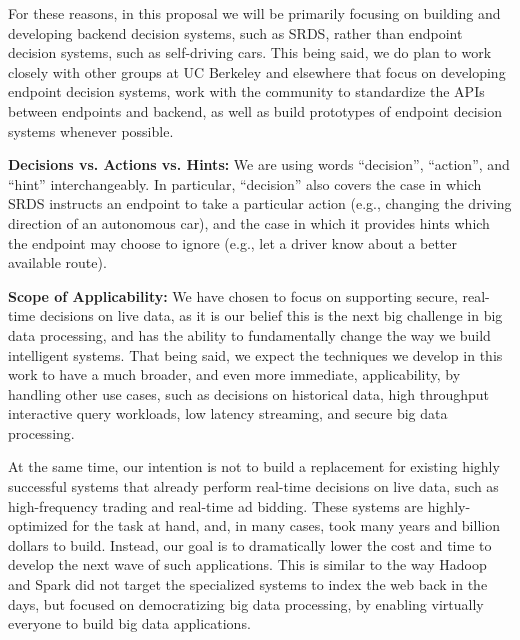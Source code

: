 For these reasons, in this proposal we will be primarily focusing on building and developing backend decision systems, such as SRDS, rather than endpoint decision systems, such as self-driving cars. This being said, we do plan to work closely with other groups at UC Berkeley and elsewhere that focus on developing endpoint decision systems, work with the community to standardize the APIs between endpoints and backend, as well as build prototypes of endpoint decision systems whenever possible.  

{\bf Decisions vs. Actions vs. Hints:} We are using words ``decision'', ``action'', and ``hint'' interchangeably. In particular, ``decision'' also covers the case in which SRDS instructs an endpoint to take a particular action (e.g., changing the driving direction of an autonomous car), and the case in which it provides hints which the endpoint may choose to ignore (e.g., let a driver know about a better available route).    

{\bf Scope of Applicability:} We have chosen to focus on supporting secure, real-time decisions on live data, as it is our belief this is the next big challenge in big data processing, and has the ability to fundamentally change the way we build intelligent systems. That being said, we expect the techniques we develop in this work to have a much broader, and even more immediate, applicability, by handling other use cases, such as decisions on historical data, high throughput interactive query workloads, low latency streaming, and secure big data processing.

At the same time, our intention is not to build a replacement for existing highly successful systems that already perform real-time decisions on live data, such as high-frequency trading and real-time ad bidding. These systems are highly-optimized for the task at hand, and, in many cases, took many years and billion dollars to build. Instead, our goal is to dramatically lower the cost and time to develop the next wave of such applications. This is similar to the way Hadoop and Spark did not target the specialized systems to index the web back in the days, but focused on democratizing big data processing, by enabling virtually everyone to build big data applications.
